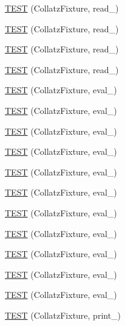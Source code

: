 \begin{DoxyCompactItemize}
\item 
\hyperlink{TestCollatz_8c_09_09_a66f4163404a0842f4f9eb6dcbfb35580}{T\-E\-S\-T} (Collatz\-Fixture, read\-\_)
\item 
\hyperlink{TestCollatz_8c_09_09_a3187ab2baa687bc11ef1402f3c5ac249}{T\-E\-S\-T} (Collatz\-Fixture, read\-\_)
\item 
\hyperlink{TestCollatz_8c_09_09_a910fd6352964fadd13f189dfb49f46f4}{T\-E\-S\-T} (Collatz\-Fixture, read\-\_)
\item 
\hyperlink{TestCollatz_8c_09_09_a0b5a76cb98b330891857af6177a4ee52}{T\-E\-S\-T} (Collatz\-Fixture, read\-\_)
\item 
\hyperlink{TestCollatz_8c_09_09_aa0fcdadaf0d4f7fe0919c37746fe7c74}{T\-E\-S\-T} (Collatz\-Fixture, eval\-\_)
\item 
\hyperlink{TestCollatz_8c_09_09_a333bb6921f06fa177e9818dbcf3eda06}{T\-E\-S\-T} (Collatz\-Fixture, eval\-\_)
\item 
\hyperlink{TestCollatz_8c_09_09_a251001c75c1226c607534268ab3a5bcb}{T\-E\-S\-T} (Collatz\-Fixture, eval\-\_)
\item 
\hyperlink{TestCollatz_8c_09_09_a033aa388470c35adc9579303dba1afa2}{T\-E\-S\-T} (Collatz\-Fixture, eval\-\_)
\item 
\hyperlink{TestCollatz_8c_09_09_ab529bbfe532bd0b6fbc11c51fe0af7e5}{T\-E\-S\-T} (Collatz\-Fixture, eval\-\_)
\item 
\hyperlink{TestCollatz_8c_09_09_adebb7237f2a00c256cd0c733885ccd58}{T\-E\-S\-T} (Collatz\-Fixture, eval\-\_)
\item 
\hyperlink{TestCollatz_8c_09_09_a4428eb890eb2825bcd806812ccf3edc3}{T\-E\-S\-T} (Collatz\-Fixture, eval\-\_)
\item 
\hyperlink{TestCollatz_8c_09_09_ad31ddf657ad806c35457117d9a862a43}{T\-E\-S\-T} (Collatz\-Fixture, eval\-\_)
\item 
\hyperlink{TestCollatz_8c_09_09_a2e12d9c89f94e5227e499d7703f9dfaa}{T\-E\-S\-T} (Collatz\-Fixture, eval\-\_)
\item 
\hyperlink{TestCollatz_8c_09_09_a8857cd942908a7bb202c0fb613a008ce}{T\-E\-S\-T} (Collatz\-Fixture, eval\-\_)
\item 
\hyperlink{TestCollatz_8c_09_09_a4a99476c845b27c020c894ff56c5331e}{T\-E\-S\-T} (Collatz\-Fixture, eval\-\_)
\item 
\hyperlink{TestCollatz_8c_09_09_a4bb3bce9465d20c35ec420e187f958c8}{T\-E\-S\-T} (Collatz\-Fixture, print\-\_)
\item 

\end{DoxyCompactItemize}
